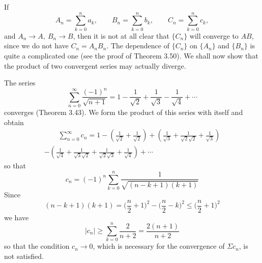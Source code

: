 \documentclass[../poma-notes.tex]{subfiles}
\begin{document}
\begin{example}
  If
  \[
    A_n = \sum_{k=0}^{n} a_k, \qquad B_n = \sum_{k=0}^{n} b_k, \qquad C_n = \sum_{k=0}^{n} c_k,
  \]
  and $A_n \to A,\ B_n \to B$, then it is not at all clear that $\{C_n\}$ will converge to $AB$, since we do not
  have $C_n = A_n B_n$. The dependence of $\{C_n\}$ on $\{A_n\}$ and $\{B_n\}$ is quite a complicated one (see
  the proof of Theorem 3.50). We shall now show that the product of two convergent series may actually diverge.

  The series
  \[
    \sum_{n=0}^{\infty}\frac{(-1)^n}{\sqrt{n+1}} = 1-\frac{1}{\sqrt{2}}+\frac{1}{\sqrt{3}}-\frac{1}{\sqrt{4}}+\cdots
  \]
  converges (Theorem 3.43). We form the product of this series with itself and obtain
  \begin{multline*}
    \qquad \sum_{n=0}^{\infty} c_n = 1-(\frac{1}{\sqrt{2}}+\frac{1}{\sqrt{2}})+
    (\frac{1}{\sqrt{3}}+\frac{1}{\sqrt{2}\sqrt{2}}+\frac{1}{\sqrt{3}}) \\
    -(\frac{1}{\sqrt{4}}+\frac{1}{\sqrt{3}\sqrt{2}}+\frac{1}{\sqrt{2}\sqrt{3}}+\frac{1}{\sqrt{4}})+\cdots
    \qquad
  \end{multline*}
  so that
  \[
    c_n = (-1)^n \sum_{k=0}^{n} \frac{1}{\sqrt{(n-k+1)(k+1)}}
  \]
  Since
  \[
    (n-k+1)(k+1) = \biggl(\frac{n}{2}+1\biggr)^2 - \biggl(\frac{n}{2}-k\biggr)^2 \le \biggl(\frac{n}{2}+1\biggr)^2
  \]
  we have
  \[
    |c_n| \ge \sum_{k=0}^{n} \frac{2}{n+2} = \frac{2(n+1)}{n+2}
  \]
  so that the condition $c_n \to 0$, which is necessary for the convergence of $\Sigma c_n$, is not satisfied.
\end{example}
\newpage
\end{document}
